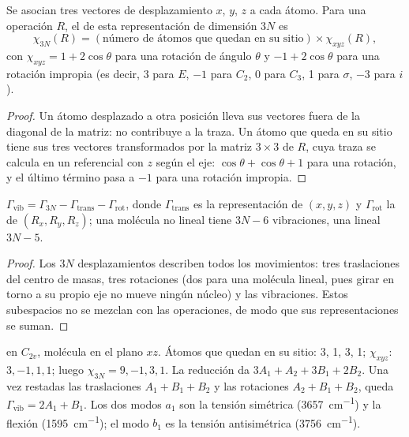 \begin{proposition}\label{prop:b3:group-theory-applied:gamma-3n}
Se asocian tres vectores de desplazamiento $x$, $y$, $z$ a cada átomo. Para una operación
$R$, el  de esta representación de dimensión $3N$ es
\[
\chi_{3N}(R) = (\text{número de átomos que quedan en su sitio}) \times \chi_{xyz}(R),
\]
con $\chi_{xyz} = 1 + 2\cos\theta$ para una rotación de ángulo $\theta$ y $-1 + 2\cos\theta$
para una rotación impropia (es decir, 3 para $E$, $-1$ para $C_2$, 0 para $C_3$, 1 para $\sigma$,
$-3$ para $i$).
\end{proposition}

\begin{proof}
Un átomo desplazado a otra posición lleva sus vectores fuera de la diagonal de
la matriz: no contribuye a la traza. Un átomo que queda en su sitio tiene
sus tres vectores transformados por la matriz $3\times3$ de $R$, cuya traza se
calcula en un referencial con $z$ según el eje: $\cos\theta + \cos\theta + 1$ para una
rotación, y el último término pasa a $-1$ para una rotación impropia.
\end{proof}

\begin{proposition}\label{prop:b3:group-theory-applied:mode-count}
$\Gamma_{\mathrm{vib}} = \Gamma_{3N} - \Gamma_{\mathrm{trans}} - \Gamma_{\mathrm{rot}}$, donde
$\Gamma_{\mathrm{trans}}$ es la representación de $(x, y, z)$ y $\Gamma_{\mathrm{rot}}$ la
de $(R_x, R_y, R_z)$; una molécula no lineal tiene $3N - 6$ vibraciones, una lineal
$3N - 5$.
\end{proposition}

\begin{proof}
Los $3N$ desplazamientos describen todos los movimientos: tres traslaciones del
centro de masas, tres rotaciones (dos para una molécula lineal, pues girar
en torno a su propio eje no mueve ningún núcleo) y las vibraciones. Estos subespacios no
se mezclan con las operaciones, de modo que sus representaciones se suman.
\end{proof}

\begin{example}[El agua]\label{ex:b3:group-theory-applied:water}
 en $C_{2v}$, molécula en el plano $xz$. Átomos que quedan en su sitio: 3, 1, 3, 1;
$\chi_{xyz}$: $3, -1, 1, 1$; luego $\chi_{3N} = 9, -1, 3, 1$. La reducción da $3A_1 +
A_2 + 3B_1 + 2B_2$. Una vez restadas las traslaciones $A_1 + B_1 + B_2$ y las rotaciones $A_2 + B_1 + B_2$,
queda $\Gamma_{\mathrm{vib}} = 2A_1 + B_1$. Los dos modos $a_1$ son la tensión
simétrica (\qty{3657}{cm^{-1}}) y la flexión (\qty{1595}{cm^{-1}}); el modo $b_1$ es
la tensión antisimétrica (\qty{3756}{cm^{-1}}).
\end{example}


